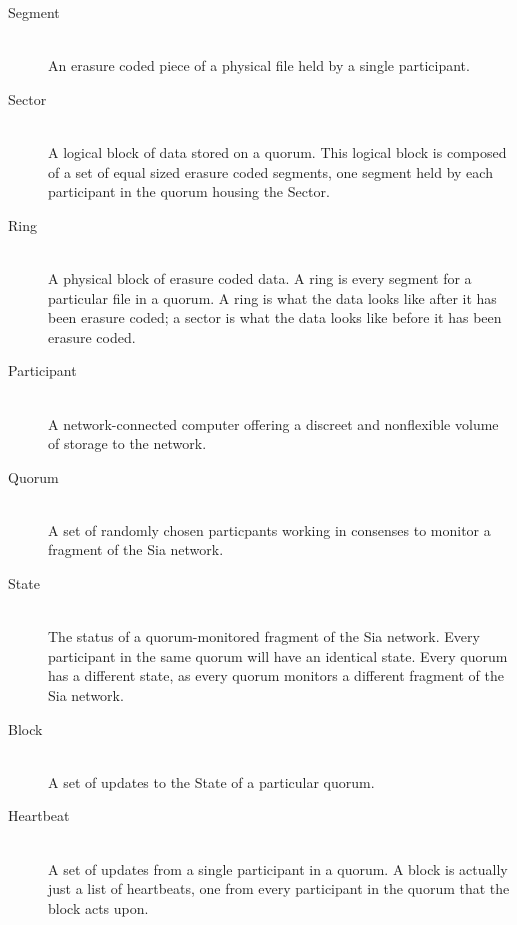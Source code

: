 \documentclass[twocolumn]{article}
\begin{document}
\begin{description}
	\item[Segment] \hfill \\
	An erasure coded piece of a physical file held by a single participant.
	\item[Sector] \hfill \\
	A logical block of data stored on a quorum.
	This logical block is composed of a set of equal sized erasure coded segments, one segment held by each participant in the quorum housing the Sector.
	\item[Ring] \hfill \\
	A physical block of erasure coded data.
	A ring is every segment for a particular file in a quorum.
	A ring is what the data looks like after it has been erasure coded; a sector is what the data looks like before it has been erasure coded.
	
	\item[Participant] \hfill \\
	A network-connected computer offering a discreet and nonflexible volume of storage to the network.
	\item[Quorum] \hfill \\
	A set of randomly chosen particpants working in consenses to monitor a fragment of the Sia network.
	\item[State] \hfill \\
	The status of a quorum-monitored fragment of the Sia network.
	Every participant in the same quorum will have an identical state.
	Every quorum has a different state, as every quorum monitors a different fragment of the Sia network.

	\item[Block] \hfill \\
	A set of updates to the State of a particular quorum.
	\item[Heartbeat] \hfill \\
	A set of updates from a single participant in a quorum.
	A block is actually just a list of heartbeats, one from every participant in the quorum that the block acts upon.
\end{description}
\end{document}

